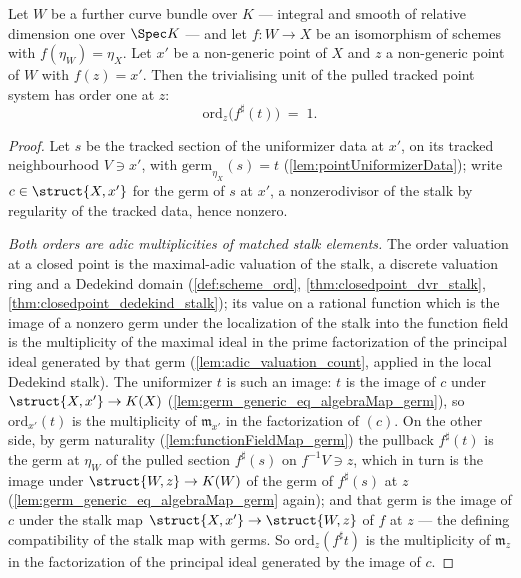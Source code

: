 \begin{lemma}
  \label{lem:ordZ_pointPullbackUnit}
  \leanok
  Let \(W\) be a further curve bundle over \(K\) --- integral and smooth of relative
  dimension one over \(\Spec K\) --- and let \(f : W \to X\) be an isomorphism of
  schemes with \(f(\eta_W) = \eta_X\). Let \(x'\) be a non-generic point of \(X\) and
  \(z\) a non-generic point of \(W\) with \(f(z) = x'\). Then the trivialising unit of
  the pulled tracked point system has order one at \(z\):
  \[
    \mathrm{ord}_z\bigl(f^{\sharp}(t)\bigr) \;=\; 1.
  \]
\end{lemma}
\begin{proof}
  \leanok
  Let \(s\) be the tracked section of the uniformizer data at \(x'\), on its tracked
  neighbourhood \(V \ni x'\), with \(\mathrm{germ}_{\eta_X}(s) = t\)
  (\ref{lem:pointUniformizerData}); write \(c \in \struct{X,x'}\) for the germ of
  \(s\) at \(x'\), a nonzerodivisor of the stalk by regularity of the tracked data,
  hence nonzero.

  \emph{Both orders are adic multiplicities of matched stalk elements.} The order
  valuation at a closed point is the maximal-adic valuation of the stalk, a discrete
  valuation ring and a Dedekind domain (\ref{def:scheme_ord},
  \ref{thm:closedpoint_dvr_stalk}, \ref{thm:closedpoint_dedekind_stalk}); its value on
  a rational function which is the image of a nonzero germ under the localization of
  the stalk into the function field is the multiplicity of the maximal ideal in the
  prime factorization of the principal ideal generated by that germ
  (\ref{lem:adic_valuation_count}, applied in the local Dedekind stalk). The
  uniformizer \(t\) is such an image: \(t\) is the image of \(c\) under
  \(\struct{X,x'} \to K(X)\) (\ref{lem:germ_generic_eq_algebraMap_germ}), so
  \(\mathrm{ord}_{x'}(t)\) is the multiplicity of \(\mathfrak m_{x'}\) in the
  factorization of \((c)\). On the other side, by germ naturality
  (\ref{lem:functionFieldMap_germ}) the pullback \(f^{\sharp}(t)\) is the germ at
  \(\eta_W\) of the pulled section \(f^{\sharp}(s)\) on \(f^{-1}V \ni z\), which in
  turn is the image under \(\struct{W,z} \to K(W)\) of the germ of \(f^{\sharp}(s)\)
  at \(z\) (\ref{lem:germ_generic_eq_algebraMap_germ} again); and that germ is the
  image of \(c\) under the stalk map \(\struct{X,x'} \to \struct{W,z}\) of \(f\) at
  \(z\) --- the defining compatibility of the stalk map with germs. So
  \(\mathrm{ord}_z(f^{\sharp}t)\) is the multiplicity of \(\mathfrak m_z\) in the
  factorization of the principal ideal generated by the image of \(c\).


\end{proof}
